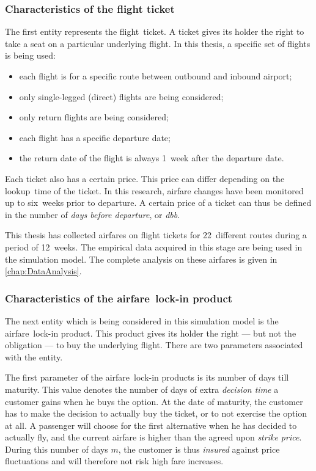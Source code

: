 \subsubsection{Characteristics of the flight ticket}
The first entity represents the flight~ticket. A ticket gives its holder the right to take a seat on a particular underlying flight. In this thesis, a specific set of flights is being used:

\begin{itemize}
\item each flight is for a specific route between outbound and inbound airport;
\item only single-legged (direct) flights are being considered;
\item only return flights are being considered;
\item each flight has a specific departure date;
\item the return date of the flight is always 1~week after the departure date.
\end{itemize}

Each ticket also has a certain price. This price can differ depending on the lookup~time of the ticket. In this research, airfare changes have been monitored up to six~weeks prior to departure. A certain price of a ticket can thus be defined in the number of \emph{days before departure}, or \emph{dbb}.

This thesis has collected airfares on flight tickets for 22~different routes during a period of 12~weeks. The empirical data acquired in this stage are being used in the simulation model. The complete analysis on these airfares is given in \autoref{chap:DataAnalysis}.

\subsubsection{Characteristics of the airfare~lock-in product}
The next entity which is being considered in this simulation model is the airfare~lock-in product. This product gives its holder the right --- but not the obligation --- to buy the underlying flight. There are two parameters associated with the entity.

The first parameter of the airfare~lock-in products is its number of days till maturity. This value denotes the number of days of extra \emph{decision time} a customer gains when he buys the option. At the date of maturity, the customer has to make the decision to actually buy the ticket, or to not exercise the option at all. A passenger will choose for the first alternative when he has decided to actually fly, and the current airfare is higher than the agreed upon \emph{strike price}. During this number of days $m$, the customer is thus \emph{insured} against price fluctuations and will therefore not risk high fare increases.


